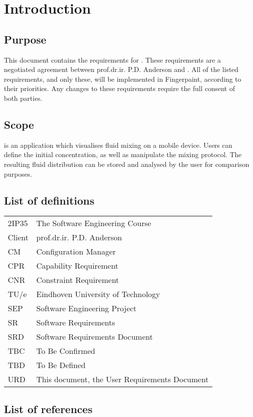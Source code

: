 \chapter{Introduction}

\section{Purpose}
This document contains the requirements for \projectname. These requirements are a negotiated agreement between prof.dr.ir. P.D. Anderson and \projectauthor. All of the listed requirements, and only these, will be implemented in Fingerpaint, according to their priorities. Any changes to these requirements require the full consent of both parties.

\section{Scope}
\projectname is an application which visualises fluid mixing on a mobile device. Users can define the initial concentration, as well as manipulate the mixing protocol. The resulting fluid distribution can be stored and analysed by the user for comparison purposes.

\section{List of definitions}
\begin{tabular}{l|l}
2IP35 & The Software Engineering Course \\
Client & prof.dr.ir. P.D. Anderson \\
CM    &Configuration Manager \\
CPR & Capability Requirement \\
CNR & Constraint Requirement \\
TU/e  &Eindhoven University of Technology \\
SEP   &Software Engineering Project \\
SR    &Software Requirements \\
SRD   &Software Requirements Document \\
TBC & To Be Confirmed \\
TBD & To Be Defined \\
URD & This document, the User Requirements Document \\
\end{tabular}

\section{List of references}


